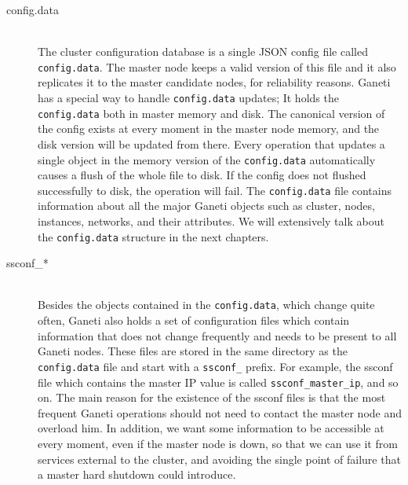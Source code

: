 \begin{description}
  \item[config.data] \hfill \\
  The cluster configuration database is a single JSON config file called
  \texttt{config.data}. The master node keeps a valid version of this file and
  it also replicates it to the master candidate nodes, for reliability
  reasons. Ganeti has a special way to handle \texttt{config.data} updates; It
  holds the \texttt{config.data} both in master memory and disk. The canonical
  version of the config exists at every moment in the master node memory, and
  the disk version will be updated from there. Every operation that updates a
  single object in the memory version of the \texttt{config.data}
  automatically causes a flush of the whole file to disk. If the config
  does not flushed successfully to disk, the operation will fail. The
  \texttt{config.data} file contains information about all the major Ganeti
  objects such as cluster, nodes, instances, networks, and their attributes.
  We will extensively talk about the \texttt{config.data} structure in the
  next chapters.

  \item[ssconf\_*] \hfill \\
  Besides the objects contained in the \texttt{config.data}, which change
  quite often, Ganeti also holds a set of configuration files which contain
  information that does not change frequently and needs to be present to all
  Ganeti nodes. These files are stored in the same directory as the
  \texttt{config.data} file and start with a \texttt{ssconf\_} prefix. For
  example, the ssconf file which contains the master IP value is called
  \texttt{ssconf\_master\_ip}, and so on. The main reason for the existence of
  the ssconf files is that the most frequent Ganeti operations should not need
  to contact the master node and overload him. In addition, we want some
  information to be accessible at every moment, even if the master node is
  down, so that we can use it from services external to the cluster, and
  avoiding the single point of failure that a master hard shutdown could
  introduce.


\end{description}
